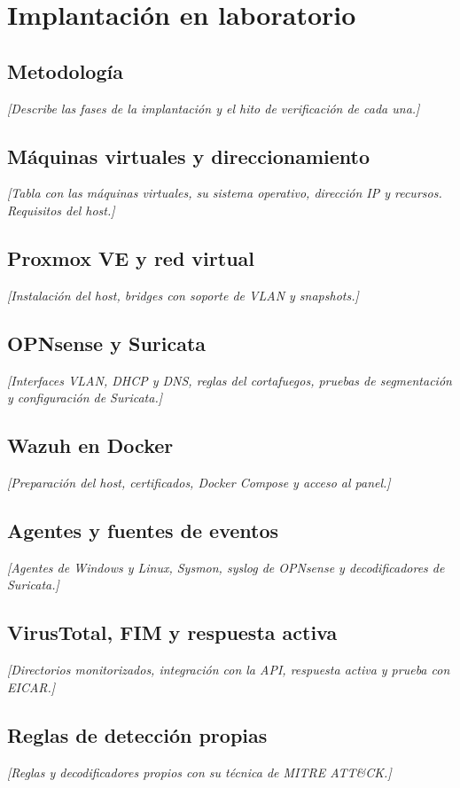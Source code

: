 \documentclass[11pt,a4paper,oneside]{report}
\newcommand{\guia}[1]{{\color{guia}\itshape[#1]}}
\begin{document}
\section{Implantación en laboratorio}
\subsection{Metodología}
\guia{Describe las fases de la implantación y el hito de verificación de cada una.}
\subsection{Máquinas virtuales y direccionamiento}
\guia{Tabla con las máquinas virtuales, su sistema operativo, dirección IP y recursos. Requisitos del host.}
\subsection{Proxmox VE y red virtual}
\guia{Instalación del host, bridges con soporte de VLAN y snapshots.}
\subsection{OPNsense y Suricata}
\guia{Interfaces VLAN, DHCP y DNS, reglas del cortafuegos, pruebas de segmentación y configuración de Suricata.}
\subsection{Wazuh en Docker}
\guia{Preparación del host, certificados, Docker Compose y acceso al panel.}
\subsection{Agentes y fuentes de eventos}
\guia{Agentes de Windows y Linux, Sysmon, syslog de OPNsense y decodificadores de Suricata.}
\subsection{VirusTotal, FIM y respuesta activa}
\guia{Directorios monitorizados, integración con la API, respuesta activa y prueba con EICAR.}
\subsection{Reglas de detección propias}
\guia{Reglas y decodificadores propios con su técnica de MITRE ATT\&CK.}

\end{document}

